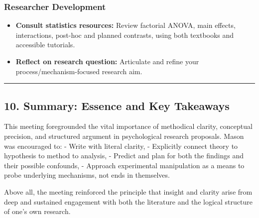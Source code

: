 \documentclass[
]{article}
\providecommand{\tightlist}{%
  \setlength{\itemsep}{0pt}\setlength{\parskip}{0pt}}
\begin{document}
\subsubsection{Researcher Development}\label{researcher-development}

\begin{itemize}
\tightlist
\item
  \textbf{Consult statistics resources:} Review factorial ANOVA, main
  effects, interactions, post-hoc and planned contrasts, using both
  textbooks and accessible tutorials.
\item
  \textbf{Reflect on research question:} Articulate and refine your
  process/mechanism-focused research aim.
\end{itemize}

\begin{center}\rule{0.5\linewidth}{0.5pt}\end{center}

\subsection{10. Summary: Essence and Key
Takeaways}\label{summary-essence-and-key-takeaways}

This meeting foregrounded the vital importance of methodical clarity,
conceptual precision, and structured argument in psychological research
proposals. Mason was encouraged to: - Write with literal clarity, -
Explicitly connect theory to hypothesis to method to analysis, - Predict
and plan for both the findings and their possible confounds, - Approach
experimental manipulation as a means to probe underlying mechanisms, not
ends in themselves.

Above all, the meeting reinforced the principle that insight and clarity
arise from deep and sustained engagement with both the literature and
the logical structure of one's own research.
\end{document}
